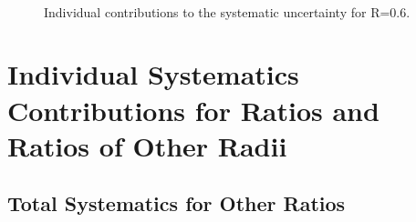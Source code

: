 \documentclass[ALICE]{ALICE_analysis_notes}
\begin{document}
\begin{appendix}
\begin{figure}[h!]
    \qquad
    \\
    \qquad
    \caption{Individual contributions to the systematic uncertainty for R=0.6.}
    \label{fig:IndividualSysR06}
\end{figure}

\newpage

\section{Individual Systematics Contributions for Ratios and Ratios of Other Radii}
\label{sec:AppendixSystematicsRatios}

\subsection{Total Systematics for Other Ratios}
\label{subsec:appendixTotalSystematicsRatios}


\end{appendix}
\end{document}
